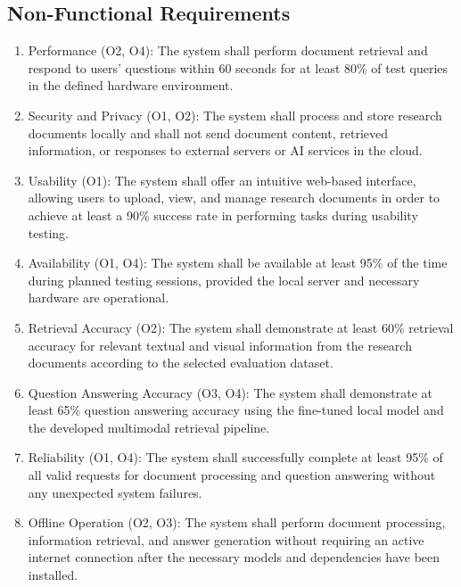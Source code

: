 \documentclass[11pt,a4paper]{report}
\begin{document}
\subsection{Non-Functional Requirements}
\begin{enumerate}
  \item Performance (O2, O4): The system shall perform document retrieval and respond to users' questions within 60 seconds for at least 80\% of test queries in the defined hardware environment.
  \item Security and Privacy (O1, O2): The system shall process and store research documents locally and shall not send document content, retrieved information, or responses to external servers or \ac{AI} services in the cloud.
  \item Usability (O1): The system shall offer an intuitive web-based interface, allowing users to upload, view, and manage research documents in order to achieve at least a 90\% success rate in performing tasks during usability testing.
  \item Availability (O1, O4): The system shall be available at least 95\% of the time during planned testing sessions, provided the local server and necessary hardware are operational.
  \item Retrieval Accuracy (O2): The system shall demonstrate at least 60\% retrieval accuracy for relevant textual and visual information from the research documents according to the selected evaluation dataset.
  \item Question Answering Accuracy (O3, O4): The system shall demonstrate at least 65\% question answering accuracy using the fine-tuned local model and the developed multimodal retrieval pipeline.
  \item Reliability (O1, O4): The system shall successfully complete at least 95\% of all valid requests for document processing and question answering without any unexpected system failures.
  \item Offline Operation (O2, O3): The system shall perform document processing, information retrieval, and answer generation without requiring an active internet connection after the necessary models and dependencies have been installed.
\end{enumerate}
\end{document}
